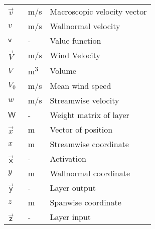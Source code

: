 \begin{longtable}{p{5cm}p{4cm}p{5cm}}
    $\vec{v}$               & \SI{}{m/s}    & Macroscopic velocity vector \\
    $v$                     & \SI{}{m/s}    & Wallnormal velocity \\    
    $\mathsf{v}$			& \SI{}{-}		& Value function \\
    $\vec{V}$				& \SI{}{m/s}	& Wind Velocity \\
    $V$						& \SI{}{m^3}	& Volume \\
    $V_0$					& \SI{}{m/s}	& Mean wind speed \\
    $w$                     & \SI{}{m/s}    & Streamwise velocity \\
    $\mathsf{W}$			& \SI{}{-}		& Weight matrix of layer \\
    $\vec{x}$               & \SI{}{m}      & Vector of position \\
    $x$                     & \SI{}{m}      & Streamwise coordinate \\
    $\vec{\mathsf{x}}$		& \SI{}{-}		& Activation \\
    $y$                     & \SI{}{m}      & Wallnormal coordinate \\
    $\vec{\mathsf{y}}$		& \SI{}{-}		& Layer output \\	
    $z$                     & \SI{}{m}      & Spanwise coordinate \\
    $\vec{\mathsf{z}}$		& \SI{}{-}		& Layer input \\
\end{longtable}

